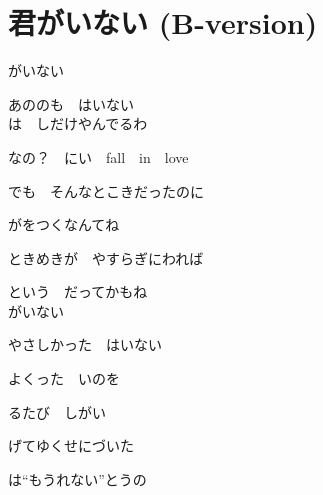 \section{ 君がいない (B-version)}
\large{

がいない

あののも　はいない
\\

は　しだけやんでるわ

なの？　にい　fall　in　love

でも　そんなとこきだったのに

がをつくなんてね

ときめきが　やすらぎにわれば

という　だってかもね
\\

がいない

やさしかった　はいない
\\


よくった　いのを

るたび　しがい

げてゆくせにづいた

は“もうれない”とうの

}
